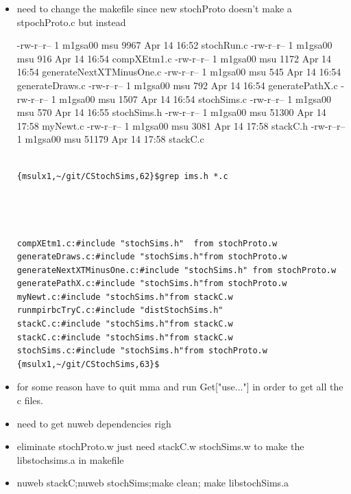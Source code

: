 \documentclass[hyperref]{labbook}
\begin{document}
\begin{itemize}
\item need to change the makefile since new stochProto doesn't make a stpochProto.c but instead 

-rw-r--r-- 1 m1gsa00 msu  9967 Apr 14 16:52 stochRun.c
-rw-r--r-- 1 m1gsa00 msu   916 Apr 14 16:54 compXEtm1.c
-rw-r--r-- 1 m1gsa00 msu  1172 Apr 14 16:54 generateNextXTMinusOne.c
-rw-r--r-- 1 m1gsa00 msu   545 Apr 14 16:54 generateDraws.c
-rw-r--r-- 1 m1gsa00 msu   792 Apr 14 16:54 generatePathX.c
-rw-r--r-- 1 m1gsa00 msu  1507 Apr 14 16:54 stochSims.c
-rw-r--r-- 1 m1gsa00 msu   570 Apr 14 16:55 stochSims.h
-rw-r--r-- 1 m1gsa00 msu 51300 Apr 14 17:58 myNewt.c
-rw-r--r-- 1 m1gsa00 msu  3081 Apr 14 17:58 stackC.h
-rw-r--r-- 1 m1gsa00 msu 51179 Apr 14 17:58 stackC.c
\begin{verbatim}

{msulx1,~/git/CStochSims,62}$grep ims.h *.c




compXEtm1.c:#include "stochSims.h"  from stochProto.w
generateDraws.c:#include "stochSims.h"from stochProto.w
generateNextXTMinusOne.c:#include "stochSims.h" from stochProto.w
generatePathX.c:#include "stochSims.h"from stochProto.w
myNewt.c:#include "stochSims.h"from stackC.w
runmpirbcTryC.c:#include "distStochSims.h"
stackC.c:#include "stochSims.h"from stackC.w
stackC.c:#include "stochSims.h"from stackC.w
stochSims.c:#include "stochSims.h"from stochProto.w
{msulx1,~/git/CStochSims,63}$

\end{verbatim}


\item for some reason have to quit mma and run Get["use..."] in order to get all the c files.

\item need to get nuweb dependencies righ
\item eliminate stochProto.w  just need stackC.w stochSims.w to make the libstochsims.a in makefile
\item nuweb stackC;nuweb stochSims;make clean; make libstochSims.a   
\end{itemize}




\end{document}
